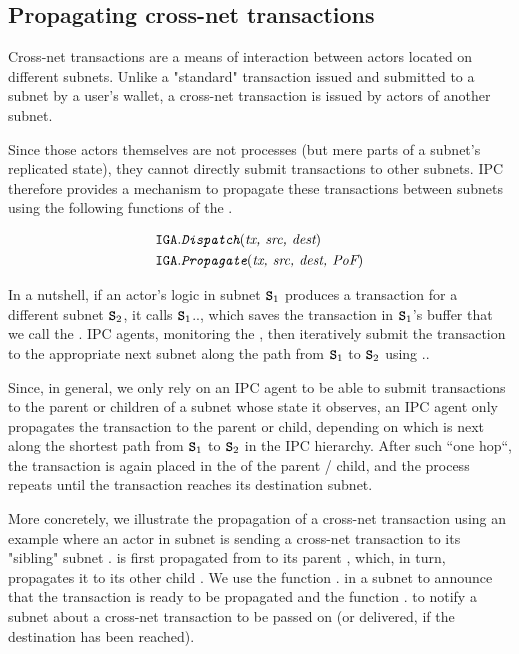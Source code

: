 \subsection{Propagating cross-net transactions}
\label{sec:cross-net-tx}

Cross-net transactions are a means of interaction between actors located on different subnets.
Unlike a "standard" transaction issued and submitted to a subnet by a user's wallet,
a cross-net transaction is issued by actors of another subnet.

Since those actors themselves are not processes (but mere parts of a subnet's replicated state),
they cannot directly submit transactions to other subnets.
IPC therefore provides a mechanism to propagate these transactions between subnets using the following functions of the \gw.

\begin{align*}
    \texttt{IGA}.&\textit{\texttt{Dispatch}}(\textit{tx, src, dest})\\
    \texttt{IGA}.&\textit{\texttt{Propagate}}(\textit{tx, src, dest, \textit{PoF}})
\end{align*}

In a nutshell, if an actor's logic in subnet $\textbf{\texttt{S}}_1$ produces a transaction for a different subnet $\textbf{\texttt{S}}_2$,
it calls $\textbf{\texttt{S}}_1$.\gw., which saves the transaction in $\textbf{\texttt{S}}_1$'s \gw buffer that we call the \emph{\postoffice}.
IPC agents, monitoring the \postoffice, then iteratively submit the transaction to the appropriate next subnet along the path from $\textbf{\texttt{S}}_1$ to $\textbf{\texttt{S}}_2$ using \gw..

Since, in general, we only rely on an IPC agent to be able to submit transactions to the parent or children of a subnet whose state it observes,
an IPC agent only propagates the transaction to the parent or child, depending on which is next along the shortest path from $\textbf{\texttt{S}}_1$ to $\textbf{\texttt{S}}_2$ in the IPC hierarchy.
After such ``one hop``, the transaction is again placed in the \postoffice of the parent / child, and the process repeats until the transaction reaches its destination subnet.

More concretely, we illustrate the propagation of a cross-net transaction using an example where an actor in subnet 
is sending a cross-net transaction  to its "sibling" subnet .
 is first propagated from  to its parent , which, in turn, propagates it to its other child .
We use the function \gw. in a subnet to announce that the transaction is ready to be propagated
and the function \gw. to notify a subnet about a cross-net transaction to be passed on (or delivered, if the destination has been reached).

